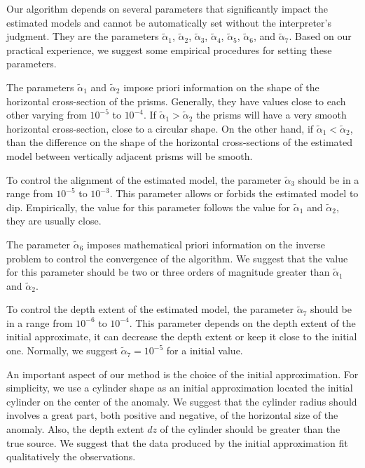 Our algorithm depends on several parameters that significantly impact the estimated models and cannot be automatically set without the interpreter’s judgment. They are the parameters $\tilde{\alpha}_1$, $\tilde{\alpha}_2$, $\tilde{\alpha}_3$, $\tilde{\alpha}_4$, $\tilde{\alpha}_5$, $\tilde{\alpha}_6$, and $\tilde{\alpha}_7$. Based on our practical experience, we suggest some empirical procedures for setting these parameters.

The parameters $\tilde{\alpha}_1$ and $\tilde{\alpha}_2$ impose priori information on the shape of the horizontal cross-section of the prisms. Generally, they have values close to each other varying from $10^{-5}$ to $10^{-4}$. If $\tilde{\alpha}_1 > \tilde{\alpha}_2$ the prisms will have a very smooth horizontal cross-section, close to a circular shape. On the other hand, if $\tilde{\alpha}_1 < \tilde{\alpha}_2$, than the difference on the shape of the horizontal cross-sections of the estimated model between vertically adjacent prisms will be smooth.

To control the alignment of the estimated model, the parameter $\tilde{\alpha}_3$ should be in a range from $10^{-5}$ to $10^{-3}$. This parameter allows or forbids the estimated model to dip. Empirically, the value for this parameter follows the value for $\tilde{\alpha}_1$ and $\tilde{\alpha}_2$, they are usually close.

The parameter $\tilde{\alpha}_6$ imposes mathematical priori information on the inverse problem to control the convergence of the algorithm. We suggest that the value for this parameter should be two or three orders of magnitude greater than $\tilde{\alpha}_1$ and $\tilde{\alpha}_2$.

To control the depth extent of the estimated model, the parameter $\tilde{\alpha}_7$ should be in a range from $10^{-6}$ to $10^{-4}$. This parameter depends on the depth extent of the initial approximate, it can decrease the depth extent or keep it close to the initial one. Normally, we suggest $\tilde{\alpha}_7=10^{-5}$ for a initial value.

An important aspect of our method is the choice of the initial approximation. For simplicity, we use a cylinder shape as an initial approximation located the initial cylinder on the center of the anomaly. We suggest that the cylinder radius should involves a great part, both positive and negative, of the horizontal size of the anomaly. Also, the depth extent $dz$ of the cylinder should be greater than the true source. We suggest that the data produced by the initial approximation fit qualitatively the observations.